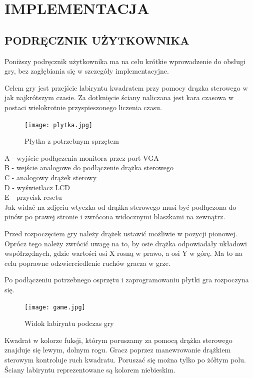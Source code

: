 \documentclass[11pt]{article}
\begin{document}
\section{IMPLEMENTACJA}

\subsection{PODRĘCZNIK UŻYTKOWNIKA}

Poniższy podręcznik użytkownika ma na celu krótkie wprowadzenie do obsługi gry, bez zagłębiania się w szczegóły implementacyjne.

Celem gry jest przejście labiryntu kwadratem przy pomocy drązka sterowego w jak najkrótszym czasie. Za dotknięcie ściany naliczana jest kara czasowa w postaci wielokrotnie przyspieszonego liczenia czasu.

\begin{figure}[h!]
\centering
\texttt{[image: plytka.jpg]} %
\caption{Płytka z potrzebnym sprzętem}
\end{figure}

A - wyjście podłączenia monitora przez port VGA \\
B - wejście analogowe do podłączenie drążka sterowego \\
C - analogowy drążek sterowy \\
D - wyświetlacz LCD \\
E - przycisk resetu \\

Jak widać na zdjęciu wtyczka od drążka sterowego musi być podłączona do pinów po prawej stronie i zwrócona widocznymi blaszkami na zewnątrz.

Przed rozpoczęciem gry należy drążek ustawić możliwie w pozycji pionowej.
Oprócz tego należy zwrócić uwagę na to, by osie drążka odpowiadały układowi współrzędnych, gdzie wartości osi X rosną w prawo, a osi Y w górę.
Ma to na celu poprawne odzwierciedlenie ruchów gracza w grze. 
%

Po podłączeniu potrzebnego osprzętu i zaprogramowaniu płytki gra rozpoczyna się. 

\begin{figure}[h!]
\centering
\texttt{[image: game.jpg]}
\caption{Widok labiryntu podczas gry}
\end{figure}

Kwadrat w kolorze fuksji, którym poruszamy za pomocą drążka sterowego znajduje się lewym, dolnym rogu.
Gracz poprzez manewrowanie drążkiem sterowym kontroluje ruch kwadratu.
Poruszać się można tylko po żółtym polu. Ściany labiryntu reprezentowane są kolorem niebieskim.
\end{document}
